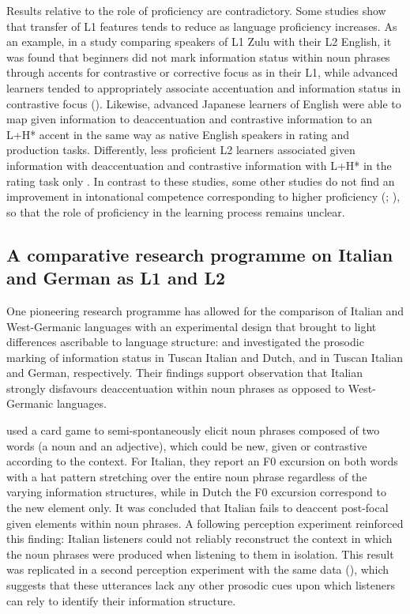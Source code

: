 Results relative to the role of proficiency are contradictory. Some studies show that transfer of L1 features tends to reduce as language proficiency increases. As an example, in a study comparing speakers of L1 Zulu with their L2 English, it was found that beginners did not mark information status within noun phrases through accents for contrastive or corrective focus as in their L1, while advanced learners tended to appropriately associate accentuation and information status in contrastive focus (\citealt{SwertsZerbian2010}). Likewise, advanced Japanese learners of English were able to map given information to deaccentuation and contrastive information to an L+H* accent in the same way as native English speakers in rating and production tasks. Differently, less proficient L2 learners associated given information with deaccentuation and contrastive information with L+H* in the rating task only \citep{Takeda2018}. In contrast to these studies, some other studies do not find an improvement in intonational competence corresponding to higher proficiency (\citealt{Bi2008}; \citealt{Verdugo2003}), so that the role of proficiency in the learning process remains unclear.

\subsection{A comparative research programme on Italian and German as L1 and L2}
\label{sec:2.1.7}
One pioneering research programme has allowed for the comparison of Italian and West-Germanic languages with an experimental design that brought to light differences ascribable to language structure: \citet{SwertsEtAl2002} and \citet{AvesaniEtAl2013,AvesaniEtAl2015} investigated the prosodic marking of information status in Tuscan Italian and Dutch, and in Tuscan Italian and German, respectively. Their findings support  observation that Italian strongly disfavours deaccentuation within noun phrases as opposed to West-Germanic languages.

\citet{SwertsEtAl2002} used a card game to semi-spontaneously elicit noun phrases composed of two words (a noun and an adjective), which could be new, given or contrastive according to the context. For Italian, they report an F0 excursion on both words with a hat pattern stretching over the entire noun phrase regardless of the varying information structures, while in Dutch the F0 excursion correspond to the new element only. It was concluded that Italian fails to deaccent post-focal given elements within noun phrases. A following perception experiment reinforced this finding: Italian listeners could not reliably reconstruct the context in which the noun phrases were produced when listening to them in isolation. This result was replicated in a second perception experiment with the same data (\citealt{KrahmerSwerts2008}), which suggests that these utterances lack any other prosodic cues upon which listeners can rely to identify their information structure.

